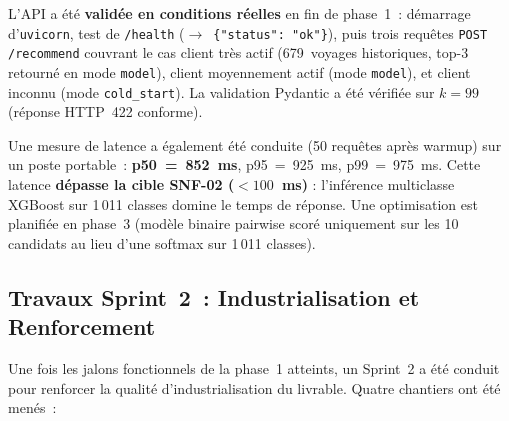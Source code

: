 \documentclass[11pt, a4paper]{article}
\begin{document}
L'API a été \textbf{validée en conditions réelles} en fin de phase~1~:
démarrage d'\texttt{uvicorn}, test de \texttt{/health}
($\rightarrow$~\texttt{\{"status": "ok"\}}), puis trois requêtes
\texttt{POST /recommend} couvrant le cas client très actif (679~voyages
historiques, top-3 retourné en mode \texttt{model}), client moyennement
actif (mode \texttt{model}), et client inconnu (mode
\texttt{cold\_start}). La validation Pydantic a été vérifiée sur
$k = 99$ (réponse HTTP~422 conforme).

Une mesure de latence a également été conduite (50 requêtes après
warmup) sur un poste portable~: \textbf{p50~=~852~ms}, p95~=~925~ms,
p99~=~975~ms. Cette latence \textbf{dépasse la cible SNF-02
($< 100$~ms)} : l'inférence multiclasse XGBoost sur 1\,011 classes
domine le temps de réponse. Une optimisation est planifiée en
phase~3 (modèle binaire pairwise scoré uniquement sur les 10
candidats au lieu d'une softmax sur 1\,011 classes).

\subsection{Travaux Sprint~2~: Industrialisation et Renforcement}

Une fois les jalons fonctionnels de la phase~1 atteints, un Sprint~2
a été conduit pour renforcer la qualité d'industrialisation du livrable.
Quatre chantiers ont été menés~:
\end{document}
